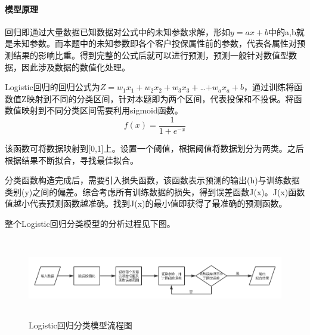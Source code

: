 \documentclass[UTF8,12pt,songti]{ctexart}
\begin{document}
\paragraph{模型原理} \quad \par
回归即通过大量数据已知数据对公式中的未知参数求解，形如$y=ax+b$中的a,b就是未知参数。而本题中的未知参数即各个客户投保属性前的参数，代表各属性对预测结果的影响比重。得到完整的公式后就可以进行预测，预测一般针对数值型数据，因此涉及数据的数值化处理。\par
Logistic回归的回归公式为$Z=w_{1}x_{1}+w_{2}x_{2}+w_{3}x_{3}+$…$+w_{a}x_{a}+b$，通过训练将函数值Z映射到不同的分类区间，针对本题即为两个区间，代表投保和不投保。将函数值映射到不同分类区间需要利用sigmoid函数。
\begin{equation}\label{logistic1}
f(x)=\frac{1}{1+e^{-x}}
\end{equation}
\par 该函数可将数据映射到[0,1]上。设置一个阈值，根据阈值将数据划分为两类。之后根据结果不断拟合，寻找最佳拟合。\par
分类函数构造完成后，需要引入损失函数，该函数表示预测的输出(h)与训练数据类别(y)之间的偏差。综合考虑所有训练数据的损失，得到误差函数J(x)。J(x)函数值越小代表预测函数越准确。找到J(x)的最小值即获得了最准确的预测函数。\par
整个Logistic回归分类模型的分析过程见下图。
\begin{figure}[H]
\centering
\includegraphics[width=18cm,height=3.5cm]{4-1-3-1.png}
\caption{Logistic回归分类模型流程图}
\end{figure}
\end{document}
